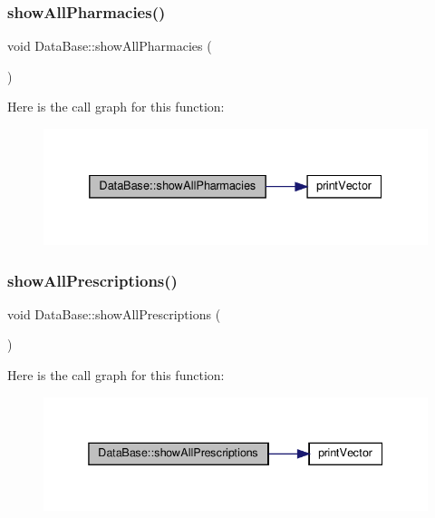 \subsubsection{\texorpdfstring{show\+All\+Pharmacies()}{showAllPharmacies()}}
{\footnotesize\ttfamily void Data\+Base\+::show\+All\+Pharmacies (\begin{DoxyParamCaption}{ }\end{DoxyParamCaption})}

Here is the call graph for this function\+:\nopagebreak
\begin{figure}[H]
\begin{center}
\leavevmode
\includegraphics[width=332pt]{classDataBase_ab00290f55389cd62d8ee5594ecf9a6b5_cgraph}
\end{center}
\end{figure}
\mbox{\label{classDataBase_a40a951f6f2c923ca315655956ab8e196}} 
\subsubsection{\texorpdfstring{show\+All\+Prescriptions()}{showAllPrescriptions()}}
{\footnotesize\ttfamily void Data\+Base\+::show\+All\+Prescriptions (\begin{DoxyParamCaption}{ }\end{DoxyParamCaption})}

Here is the call graph for this function\+:\nopagebreak
\begin{figure}[H]
\begin{center}
\leavevmode
\includegraphics[width=338pt]{classDataBase_a40a951f6f2c923ca315655956ab8e196_cgraph}
\end{center}
\end{figure}
\mbox{\label{classDataBase_a74dcc435917c328bd89aaf5fd3cb804d}} 
